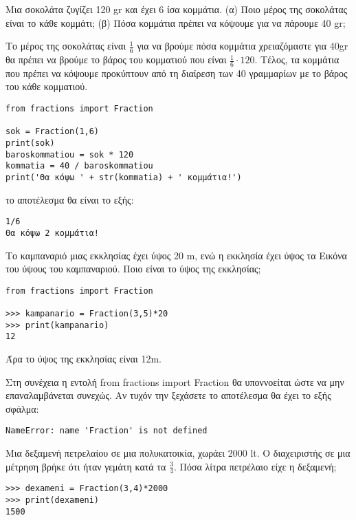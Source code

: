 \begin{exercise}
Μια σοκολάτα ζυγίζει 120 gr και έχει 6 ίσα κομμάτια.
(α)   Ποιο μέρος της σοκολάτας είναι το κάθε κομμάτι;
(β)   Πόσα κομμάτια πρέπει να κόψουμε για να πάρουμε 40 gr;
\end{exercise}

Το μέρος της σοκολάτας είναι $\frac{1}{6}$ για να βρούμε πόσα κομμάτια χρειαζόμαστε για 40gr θα πρέπει να βρούμε το βάρος του κομματιού που είναι $\frac{1}{6}\cdot 120$. Τέλος, τα κομμάτια που πρέπει να κόψουμε προκύπτουν από τη διαίρεση των 40 γραμμαρίων με το βάρος του κάθε κομματιού.

\begin{lstlisting}
from fractions import Fraction

sok = Fraction(1,6)
print(sok)
baroskommatiou = sok * 120
kommatia = 40 / baroskommatiou
print('Θα κόψω ' + str(kommatia) + ' κομμάτια!')
\end{lstlisting}
το αποτέλεσμα θα είναι το εξής:
\begin{lstlisting}
1/6
Θα κόψω 2 κομμάτια!
\end{lstlisting}

\begin{exercise}Το καμπαναριό μιας εκκλησίας έχει ύψος 20 m, ενώ η εκκλησία έχει ύψος τα Εικόνα του ύψους του καμπαναριού. Ποιο είναι το ύψος της εκκλησίας;\end{exercise}

\begin{lstlisting}
from fractions import Fraction

>>> kampanario = Fraction(3,5)*20
>>> print(kampanario)
12
\end{lstlisting}
Άρα το ύψος της εκκλησίας είναι 12m.

Στη συνέχεια η εντολή from fractions import Fraction θα υποννοείται ώστε να μην επαναλαμβάνεται συνεχώς. Αν τυχόν την ξεχάσετε το αποτέλεσμα θα έχει το εξής σφάλμα:
\begin{lstlisting}
NameError: name 'Fraction' is not defined
\end{lstlisting}
\begin{exercise} Μια δεξαμενή πετρελαίου σε μια πολυκατοικία, χωράει 2000 lt. Ο διαχειριστής σε μια μέτρηση βρήκε ότι ήταν γεμάτη κατά τα $\frac{3}{4}$. Πόσα λίτρα πετρέλαιο είχε η δεξαμενή;
\end{exercise}
\begin{lstlisting}
>>> dexameni = Fraction(3,4)*2000
>>> print(dexameni)
1500
\end{lstlisting}

